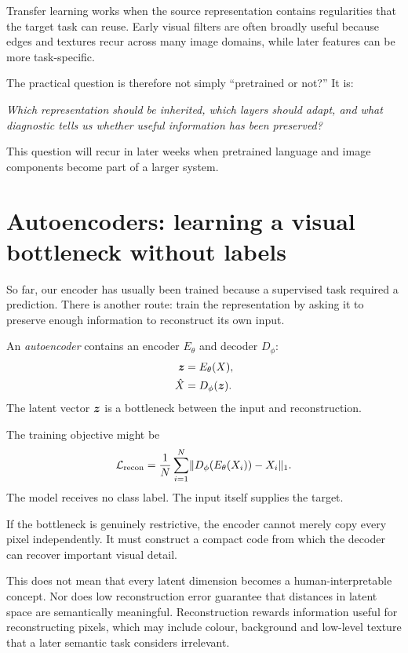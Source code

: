 Transfer learning works when the source representation contains regularities that the target task can reuse. Early visual filters are often broadly useful because edges and textures recur across many image domains, while later features can be more task-specific.

The practical question is therefore not simply ``pretrained or not?'' It is:
\begin{center}
\emph{Which representation should be inherited, which layers should adapt, and what diagnostic tells us whether useful information has been preserved?}
\end{center}

This question will recur in later weeks when pretrained language and image components become part of a larger system.

\section{Autoencoders: learning a visual bottleneck without labels}

So far, our encoder has usually been trained because a supervised task required a prediction. There is another route: train the representation by asking it to preserve enough information to reconstruct its own input.

An \emph{autoencoder} contains an encoder \(E_\theta\) and decoder \(D_\phi\):
\begin{align}
  \bm{z} &= E_\theta(X),\\
  \hat X &= D_\phi(\bm{z}).
\end{align}
The latent vector \(\bm{z}\) is a bottleneck between the input and reconstruction.

The training objective might be
\begin{equation}
  \mathcal{L}_{\mathrm{recon}}
  = \frac{1}{N}\sum_{i=1}^{N}
  \lVert D_\phi(E_\theta(X_i))-X_i\rVert_1.
  \label{eq:week5-autoencoder-loss}
\end{equation}
The model receives no class label. The input itself supplies the target.

If the bottleneck is genuinely restrictive, the encoder cannot merely copy every pixel independently. It must construct a compact code from which the decoder can recover important visual detail.

This does not mean that every latent dimension becomes a human-interpretable concept. Nor does low reconstruction error guarantee that distances in latent space are semantically meaningful. Reconstruction rewards information useful for reconstructing pixels, which may include colour, background and low-level texture that a later semantic task considers irrelevant.

